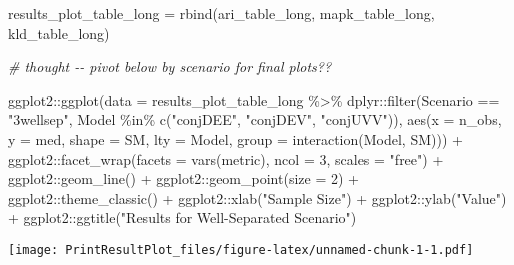 \documentclass[
]{article}
\newenvironment{Shaded}{\begin{snugshade}}{\end{snugshade}}
\newcommand{\AttributeTok}[1]{\textcolor[rgb]{0.77,0.63,0.00}{#1}}
\newcommand{\CommentTok}[1]{\textcolor[rgb]{0.56,0.35,0.01}{\textit{#1}}}
\newcommand{\DecValTok}[1]{\textcolor[rgb]{0.00,0.00,0.81}{#1}}
\newcommand{\FunctionTok}[1]{\textcolor[rgb]{0.00,0.00,0.00}{#1}}
\newcommand{\NormalTok}[1]{#1}
\newcommand{\OtherTok}[1]{\textcolor[rgb]{0.56,0.35,0.01}{#1}}
\newcommand{\SpecialCharTok}[1]{\textcolor[rgb]{0.00,0.00,0.00}{#1}}
\newcommand{\StringTok}[1]{\textcolor[rgb]{0.31,0.60,0.02}{#1}}
\begin{document}
\begin{Shaded}
\begin{Highlighting}[]
\NormalTok{results\_plot\_table\_long }\OtherTok{=} \FunctionTok{rbind}\NormalTok{(ari\_table\_long, mapk\_table\_long, kld\_table\_long)}

\CommentTok{\# thought {-}{-} pivot below by scenario for final plots??}

\NormalTok{ggplot2}\SpecialCharTok{::}\FunctionTok{ggplot}\NormalTok{(}\AttributeTok{data =}\NormalTok{ results\_plot\_table\_long }\SpecialCharTok{\%\textgreater{}\%} 
\NormalTok{                  dplyr}\SpecialCharTok{::}\FunctionTok{filter}\NormalTok{(Scenario }\SpecialCharTok{==} \StringTok{"3wellsep"}\NormalTok{, Model }\SpecialCharTok{\%in\%} \FunctionTok{c}\NormalTok{(}\StringTok{"conjDEE"}\NormalTok{, }\StringTok{"conjDEV"}\NormalTok{, }\StringTok{"conjUVV"}\NormalTok{)), }
                \FunctionTok{aes}\NormalTok{(}\AttributeTok{x =}\NormalTok{ n\_obs, }\AttributeTok{y =}\NormalTok{ med, }\AttributeTok{shape =}\NormalTok{ SM, }\AttributeTok{lty =}\NormalTok{ Model, }
                    \AttributeTok{group =} \FunctionTok{interaction}\NormalTok{(Model, SM))) }\SpecialCharTok{+}
\NormalTok{  ggplot2}\SpecialCharTok{::}\FunctionTok{facet\_wrap}\NormalTok{(}\AttributeTok{facets =} \FunctionTok{vars}\NormalTok{(metric), }\AttributeTok{ncol =} \DecValTok{3}\NormalTok{, }\AttributeTok{scales =} \StringTok{"free"}\NormalTok{) }\SpecialCharTok{+}
\NormalTok{  ggplot2}\SpecialCharTok{::}\FunctionTok{geom\_line}\NormalTok{() }\SpecialCharTok{+} 
\NormalTok{  ggplot2}\SpecialCharTok{::}\FunctionTok{geom\_point}\NormalTok{(}\AttributeTok{size =} \DecValTok{2}\NormalTok{) }\SpecialCharTok{+}
\NormalTok{  ggplot2}\SpecialCharTok{::}\FunctionTok{theme\_classic}\NormalTok{() }\SpecialCharTok{+}
\NormalTok{  ggplot2}\SpecialCharTok{::}\FunctionTok{xlab}\NormalTok{(}\StringTok{"Sample Size"}\NormalTok{) }\SpecialCharTok{+}
\NormalTok{  ggplot2}\SpecialCharTok{::}\FunctionTok{ylab}\NormalTok{(}\StringTok{"Value"}\NormalTok{) }\SpecialCharTok{+}
\NormalTok{  ggplot2}\SpecialCharTok{::}\FunctionTok{ggtitle}\NormalTok{(}\StringTok{"Results for Well{-}Separated Scenario"}\NormalTok{)}
\end{Highlighting}
\end{Shaded}

\texttt{[image: PrintResultPlot\_files/figure-latex/unnamed-chunk-1-1.pdf]}
\end{document}
